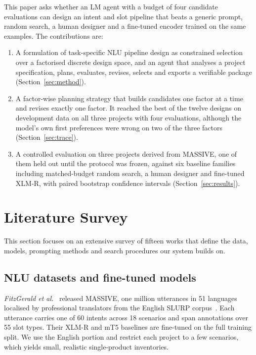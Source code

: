 \documentclass[conference]{IEEEtran}
\begin{document}
This paper asks whether an LM agent with a budget of four candidate evaluations can design an intent and slot pipeline that beats a generic prompt, random search, a human designer and a fine-tuned encoder trained on the same examples. The contributions are:
\begin{enumerate}
\item A formulation of task-specific NLU pipeline design as constrained selection over a factorised discrete design space, and an agent that analyses a project specification, plans, evaluates, revises, selects and exports a verifiable package (Section~\ref{sec:method}).
\item A factor-wise planning strategy that builds candidates one factor at a time and revises exactly one factor. It reached the best of the twelve designs on development data on all three projects with four evaluations, although the model's own first preferences were wrong on two of the three factors (Section~\ref{sec:trace}).
\item A controlled evaluation on three projects derived from MASSIVE, one of them held out until the protocol was frozen, against six baseline families including matched-budget random search, a human designer and fine-tuned XLM-R, with paired bootstrap confidence intervals (Section~\ref{sec:results}).
\end{enumerate}

\section{Literature Survey}
\label{sec:related}

This section focuses on an extensive survey of fifteen works that define the data, models, prompting methods and search procedures our system builds on.

\subsection{NLU datasets and fine-tuned models}

\emph{FitzGerald et al.}~\cite{fitzgerald2023massive} released MASSIVE, one million utterances in 51 languages localised by professional translators from the English SLURP corpus~\cite{bastianelli2020slurp}. Each utterance carries one of 60 intents across 18 scenarios and span annotations over 55 slot types. Their XLM-R and mT5 baselines are fine-tuned on the full training split. We use the English portion and restrict each project to a few scenarios, which yields small, realistic single-product inventories.
\end{document}

